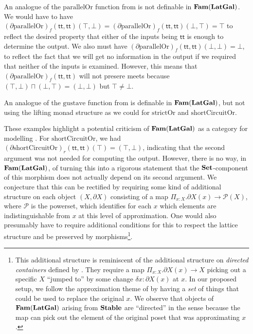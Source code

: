 An analogue of the $\mathrm{parallelOr}$ function from
 is not definable in $\mathbf{Fam}(\mathbf{LatGal})$. We would have
to have
$(\partial \mathrm{parallelOr})_f(\mathsf{tt},\mathsf{tt})(\top,\bot)
= (\partial \mathrm{parallelOr})_f(\mathsf{tt},\mathsf{tt})(\bot,\top)
= \top$ to reflect the desired property that either of the inputs
being $\mathsf{tt}$ is enough to determine the output. We also must
have
$(\partial \mathrm{parallelOr})_f(\mathsf{tt},\mathsf{tt})(\bot,\bot)
= \bot$, to reflect the fact that we will get no information in the
output if we required that neither of the inputs is examined. However,
this means that
$(\partial \mathrm{parallelOr})_f(\mathsf{tt},\mathsf{tt})$ will not
presere meets because $(\top,\bot) \sqcap (\bot,\top) = (\bot,\bot)$
but $\top \neq \bot$.

An analogue of the $\mathrm{gustave}$ function from
 is definable in $\mathbf{Fam}(\mathbf{LatGal})$, but not using the
lifting monad structure as we could for $\mathrm{strictOr}$ and
$\mathrm{shortCircuitOr}$.

\begin{remark}
  \label{rem:further-structure}
  These examples highlight a potential criticism of $\mathbf{Fam}(\mathbf{LatGal})$ as
  a category for modelling \GPS. For $\mathrm{shortCircuitOr}$, we had
  $(\partial \mathrm{shortCircuitOr})_r(\mathsf{tt},\mathsf{tt})(\top)
  = (\top, \bot)$, indicating that the second argument was not needed
  for computing the output. However, there is no way, in
  $\mathbf{Fam}(\mathbf{LatGal})$, of turning this into a rigorous statement that the
  $\mathbf{Set}$-component of this morphism does not actually depend on its
  second argument. We conjecture that this can be rectified by
  requiring some kind of additional structure on each object
  $(X, \partial X)$ consisting of a map
  $\Pi_{x : X}.\partial X(x) \to \mathcal{P}(X)$, where $\mathcal{P}$
  is the powerset, which identifies for each $x$ which elements are
  indistinguishable from $x$ at this level of approximation. One would
  also presumably have to require additional conditions for this to
  respect the lattice structure and be preserved by
  morphisms\footnote{This additional structure is reminiscent of the
    additional structure on \emph{directed containers} defined by
    \citet{ahman-chapman-uustalu2012}. They require a map
    $\Pi_{x : X}.\partial X(x) \to X$ picking out a specific $X$
    ``jumped to'' by some change $\delta x : \partial X(x)$ at $x$. In
    our proposed setup, we follow the approximation theme of \GPS by
    having a \emph{set} of things that could be used to replace the
    original $x$. We observe that objects of $\mathbf{Fam}(\mathbf{LatGal})$ arising
    from $\mathbf{Stable}$ are ``directed'' in the
    \citet{ahman-chapman-uustalu2012} sense because the map can pick
    out the element of the original poset that was approximating
    $x$.}.
\end{remark}

